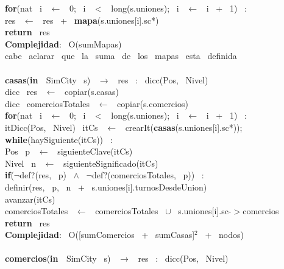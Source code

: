 \indent \textbf{for}(nat \ i \ $\leftarrow$ \ 0; \ i \ $<$ \ long(s.uniones); \ i \ $\leftarrow$ \ i \ + \ 1) \ : \ \\
\indent \indent res \ $\leftarrow$ \ res \ + \ \textbf{mapa}(s.uniones[i].sc*)\\
\indent \textbf{return} \ res\\
\textbf{Complejidad}: \ O(sumMapas) \ \\
cabe \ aclarar \ que \ la \ suma \ de \ los \ mapas \ esta \ definida\\
\noindent\makebox[\linewidth]{\rule{\textwidth}{0.4pt}}
\\
\noindent\makebox[\linewidth]{\rule{\textwidth}{0.4pt}}
\textbf{casas}(\textbf{in \ }SimCity \ s) \ $\rightarrow $ \ res \ : \ dicc(Pos, \ Nivel)\\
\indent dicc \ res \ $\leftarrow$ \ copiar(s.casas)\\
\indent dicc \ comerciosTotales \ $\leftarrow$ \ copiar(s.comercios)\\
\indent \textbf{for}(nat \ i \ $\leftarrow$ \ 0; \ i \ $<$ \ long(s.uniones); \ i \ $\leftarrow$ \ i \ + \ 1) \ : \ \\
\indent \indent itDicc(Pos, \ Nivel) \ itCs \ $\leftarrow$ \ crearIt(\textbf{casas}(s.uniones[i].sc*));\\
\indent \indent \textbf{while}(haySiguiente(itCs)) \ :\\
\indent \indent \indent Pos \ p \ $\leftarrow$ \ siguienteClave(itCs)\\
\indent \indent \indent Nivel \ n \ $\leftarrow$ \ siguienteSignificado(itCs)\\
\indent \indent \indent \textbf{if}($\neg$def?(res, \ p) \ $\wedge$ \ $\neg$def?(comerciosTotales, \ p)) \ :\\
\indent \indent \indent \indent definir(res, \ p, \ n \ + \ s.uniones[i].turnosDesdeUnion)\\
\indent \indent \indent avanzar(itCs)\\
\indent \indent comerciosTotales \ $\leftarrow$ \ comerciosTotales \ $\cup$ \ s.uniones[i].sc-$>$comercios\\
\indent \textbf{return} \ res\\
\textbf{Complejidad}: \ O([sumComercios \ + \ sumCasas]$^2$ \ + \ nodos)\\
\noindent\makebox[\linewidth]{\rule{\textwidth}{0.4pt}}
\\
\noindent\makebox[\linewidth]{\rule{\textwidth}{0.4pt}}
\textbf{comercios}(\textbf{in \ }SimCity \ s) \ $\rightarrow $ \ res \ : \ dicc(Pos, \ Nivel)\\
